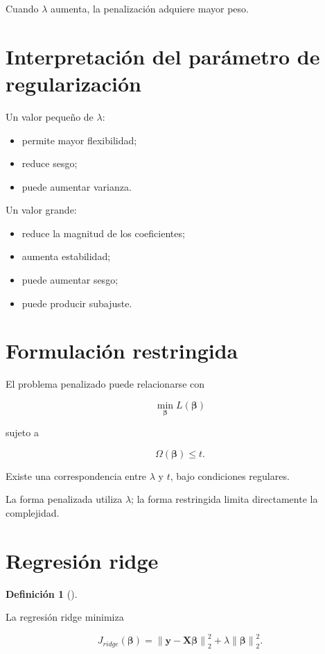 \documentclass[
  spanish,
  11pt,
  letterpaper,
  DIV=11,
  numbers=noendperiod]{scrreprt}
\providecommand{\tightlist}{%
  \setlength{\itemsep}{0pt}\setlength{\parskip}{0pt}}
\theoremstyle{definition}
\newtheorem{definition}{Definición}[chapter]
\theoremstyle{plain}
\theoremstyle{definition}
\theoremstyle{remark}
\begin{document}
Cuando \(\lambda\) aumenta, la penalización adquiere mayor peso.

\section{Interpretación del parámetro de
regularización}\label{interpretaciuxf3n-del-paruxe1metro-de-regularizaciuxf3n}

Un valor pequeño de \(\lambda\):

\begin{itemize}
\tightlist
\item
  permite mayor flexibilidad;
\item
  reduce sesgo;
\item
  puede aumentar varianza.
\end{itemize}

Un valor grande:

\begin{itemize}
\tightlist
\item
  reduce la magnitud de los coeficientes;
\item
  aumenta estabilidad;
\item
  puede aumentar sesgo;
\item
  puede producir subajuste.
\end{itemize}

\section{Formulación restringida}\label{formulaciuxf3n-restringida}

El problema penalizado puede relacionarse con

\[
\min_{\boldsymbol{\beta}}
L(\boldsymbol{\beta})
\]

sujeto a

\[
\Omega(\boldsymbol{\beta})
\leq t.
\]

Existe una correspondencia entre \(\lambda\) y \(t\), bajo condiciones
regulares.

La forma penalizada utiliza \(\lambda\); la forma restringida limita
directamente la complejidad.

\section{Regresión ridge}\label{regresiuxf3n-ridge}

\begin{definition}[]\protect\hypertarget{def-ridge}{}\label{def-ridge}

La regresión ridge minimiza

\[
J_{ridge}(\boldsymbol{\beta})
=
\left\|
\mathbf{y}
-
\mathbf{X}\boldsymbol{\beta}
\right\|_2^2
+
\lambda
\left\|
\boldsymbol{\beta}
\right\|_2^2.
\]

\end{definition}
\end{document}

